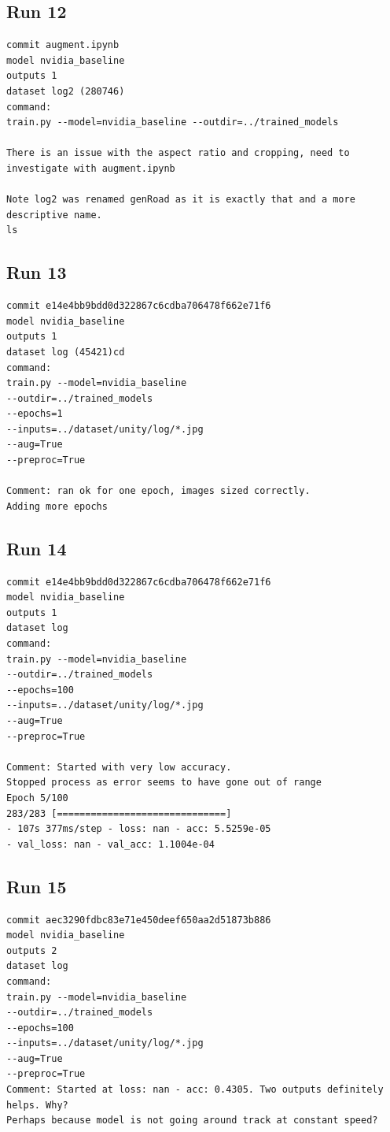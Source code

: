 \subsection{Run 12}
\begin{verbatim}
commit augment.ipynb
model nvidia_baseline
outputs 1
dataset log2 (280746)
command:
train.py --model=nvidia_baseline --outdir=../trained_models

There is an issue with the aspect ratio and cropping, need to investigate with augment.ipynb

Note log2 was renamed genRoad as it is exactly that and a more descriptive name.
ls
\end{verbatim}

\subsection{Run 13}
\begin{verbatim}
commit e14e4bb9bdd0d322867c6cdba706478f662e71f6
model nvidia_baseline
outputs 1
dataset log (45421)cd 
command:
train.py --model=nvidia_baseline
--outdir=../trained_models
--epochs=1
--inputs=../dataset/unity/log/*.jpg
--aug=True
--preproc=True

Comment: ran ok for one epoch, images sized correctly.
Adding more epochs
\end{verbatim}

\subsection{Run 14}
\begin{verbatim}
commit e14e4bb9bdd0d322867c6cdba706478f662e71f6
model nvidia_baseline
outputs 1
dataset log
command:
train.py --model=nvidia_baseline
--outdir=../trained_models
--epochs=100
--inputs=../dataset/unity/log/*.jpg
--aug=True
--preproc=True

Comment: Started with very low accuracy.
Stopped process as error seems to have gone out of range
Epoch 5/100
283/283 [==============================] 
- 107s 377ms/step - loss: nan - acc: 5.5259e-05 
- val_loss: nan - val_acc: 1.1004e-04
\end{verbatim}

\subsection{Run 15}
\begin{verbatim}
commit aec3290fdbc83e71e450deef650aa2d51873b886
model nvidia_baseline
outputs 2
dataset log
command:
train.py --model=nvidia_baseline
--outdir=../trained_models
--epochs=100
--inputs=../dataset/unity/log/*.jpg
--aug=True
--preproc=True
Comment: Started at loss: nan - acc: 0.4305. Two outputs definitely helps. Why?
Perhaps because model is not going around track at constant speed?

\end{verbatim}

